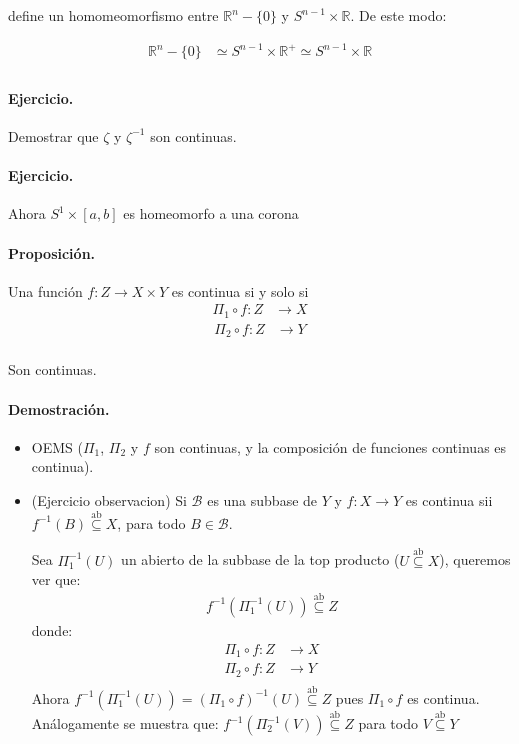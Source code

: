 define un homomeomorfismo entre $\mathbb R^{n} - \{0\}$ y $S^{n-1} \times \mathbb R$. De este modo:

\begin{align*}
  \mathbb R^n - \{0\} &\simeq S^{n-1} \times \mathbb R^{+} \simeq S^{n-1} \times \mathbb R\\
\end{align*}

\paragraph{Ejercicio.} Demostrar que $\zeta$ y $\zeta^{-1}$ son continuas.
\paragraph{Ejercicio.} Ahora $S^{1} \times[a,b]$ es homeomorfo  a una corona 

\paragraph{\textbf{Proposición.}} Una función $f: Z \to X \times Y$ es continua si y solo si 
\begin{align*}
\Pi_1 \circ f: Z &\to X
\end{align*}
\begin{align*}
\Pi_2 \circ f: Z &\to Y\\
\end{align*}

Son continuas.

\paragraph{\textbf{Demostración.}} 
\begin{itemize}
  \item [$\implies$] OEMS ($\Pi_1$, $\Pi_2$ y $f$ son continuas, y la composición de funciones continuas es continua).
  \item [$\impliedby$]  (Ejercicio observacion)
  Si $\mathcal B$ es una subbase de $Y$ y $f:X\to Y$ es continua sii $f^{-1}(B) \overset{\text{ab}}\subseteq X$, para todo $B \in \mathcal B$.
  
  Sea $\Pi_1^{-1}(U)$ un abierto de la subbase de la top producto ($U\overset{\text{ab}}\subseteq X$), queremos ver que:
  \begin{align*}
  f^{-1}(\Pi_1^{-1}(U)) \overset{\text{ab}}\subseteq Z
  \end{align*}
 donde: 
 \begin{align*}
  \Pi_1 \circ f: Z &\to X\\
  \Pi_2 \circ f: Z &\to Y\\
 \end{align*}
 Ahora $f^{-1}(\Pi_1^{-1}(U)) =  (\Pi_1 \circ f)^{-1}(U) \overset{\text{ab}}\subseteq Z$ pues $\Pi_1 \circ f$ es continua. Análogamente se muestra que:
 $f^{-1}(\Pi_2^{-1}(V)) \overset{\text{ab}}\subseteq Z$ para todo $V \overset{\text{ab}}\subseteq Y$
\end{itemize}



